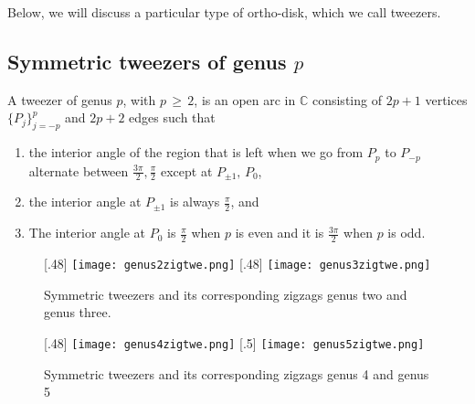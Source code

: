 \documentclass[12pt,epsfig,tikz,multi]{amsart}
\numberwithin{equation}{section}
\def \C {{\mathbb {C}}}
\begin{document}
Below, we will discuss a particular type of ortho-disk, which we call tweezers. 

\subsection{Symmetric tweezers of genus $p$}\label{definition:tweezer}

A tweezer of genus $p$, with $p\,\geq\, 2$, is an open arc in $\C$ consisting of $2p+1$ vertices $\lbrace 
P_j\rbrace_{j=-p}^{p}$ and $2p+2$ edges such that
\begin{enumerate}
\item the interior angle of the region that is left when we go from $P_{p}$ to $P_{-p}$ alternate
between $\frac{3\pi}{2},\frac{\pi}{2}$ except at $P_{\pm 1},\,P_0$,

\item the interior angle at $P_{\pm 1}$ is always $\frac{\pi}{2}$, and

\item The interior angle at $P_0$ is $\frac{\pi}{2}$ when $p$ is even and it is $\frac{3\pi}{2}$ when $p$ is odd.
\end{enumerate}

\begin{figure}[ht]
 [.48\linewidth]{
   \texttt{[image: genus2zigtwe.png]}
  }
  [.48\linewidth]{
  \texttt{[image: genus3zigtwe.png]}
  }
  \caption{Symmetric tweezers and its corresponding zigzags genus two and genus three.}\label{figure 3:different tweezers g2 g3}
\end{figure}
\begin{figure}[ht]
  [.48\linewidth]{
   \texttt{[image: genus4zigtwe.png]}
  }
  \hfill
  [.5\linewidth]{
    \texttt{[image: genus5zigtwe.png]}
  }
  \caption{Symmetric tweezers and its corresponding zigzags genus 4 and genus 5}\label{figure 3:different tweezers g4 g5}
\end{figure}
\end{document}
